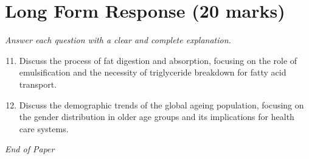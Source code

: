 \documentclass[12pt]{article}
\begin{document}
\section*{Long Form Response (20 marks)}
\textit{Answer each question with a clear and complete explanation.}
\begin{enumerate}[label=\arabic*.]
\setcounter{enumi}{10}
\item Discuss the process of fat digestion and absorption, focusing on the role of
emulsification and the necessity of triglyceride breakdown for fatty acid transport.
\item Discuss the demographic trends of the global ageing population, focusing on the gender
distribution in older age groups and its implications for health care systems.
\end{enumerate}

\vfill
\noindent\textit{End of Paper}
\end{document}

